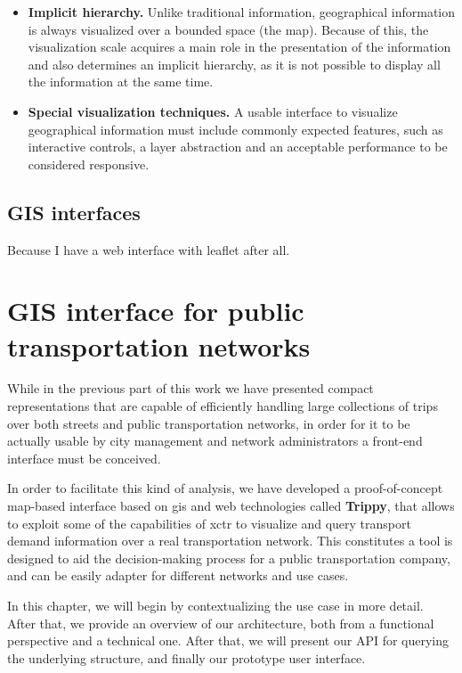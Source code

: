 \begin{itemize}
        \item \textbf{Implicit hierarchy.} Unlike traditional information, geographical information is always visualized over a bounded space (the map). Because of this, the visualization scale acquires a main role in the presentation of the information and also determines an implicit hierarchy, as it is not possible to display all the information at the same time.
        
        \item \textbf{Special visualization techniques.} A usable interface to visualize geographical information must include commonly expected features, such as interactive controls, a layer abstraction and an acceptable performance to be considered responsive.
    \end{itemize}

    \section{GIS interfaces}
	Because I have a web interface with leaflet after all.

\chapter{GIS interface for public transportation networks}
\label{sec:gis}
	While in the previous part of this work we have presented compact representations that are capable of efficiently handling large collections of trips over both streets and public transportation networks, in order for it to be actually usable by city management and network administrators a front-end interface must be conceived.
	
	In order to facilitate this kind of analysis, we have developed a proof-of-concept map-based interface based on \gls{gis} and web technologies called \textbf{Trippy}, that allows to exploit some of the capabilities of \gls{xctr} to visualize and query transport demand information over a real transportation network. This constitutes a tool is designed to aid the decision-making process for a public transportation company, and can be easily adapter for different networks and use cases.
	
	In this chapter, we will begin by contextualizing the use case in more detail. After that, we provide an overview of our architecture, both from a functional perspective and a technical one. After that, we will present our API for querying the underlying structure, and finally our prototype user interface.
	
